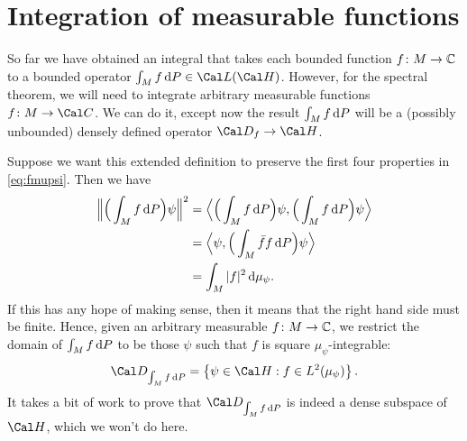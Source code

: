 \section{Integration of measurable functions}

So far we have obtained an integral that takes each bounded function
\(f\colon M\to\mathbb{C}\) to a bounded operator \(\int_Mf\d P\in\Cal L(\Cal
H)\).
However, for the spectral theorem, we will need to integrate arbitrary
measurable functions \(f\colon M\to\Cal C\). We can do it, except now
the result \(\int_Mf\mathop{}\!\mathrm{d} P\) will be a (possibly unbounded) densely
defined operator \(\Cal D_f\to\Cal H\).

Suppose we want this extended definition to preserve the first four
properties in \eqref{eq:fmupsi}. Then we have
\begin{align}
  \Big\|\Big(\int_Mf\mathop{}\!\mathrm{d} P\Big) \psi\Big\|^{2}
  &= \Big\langle\Big(\int_Mf\mathop{}\!\mathrm{d} P\Big) \psi,
    \Big(\int_Mf\mathop{}\!\mathrm{d} P\Big) \psi\Big\rangle \\
  &= \Big\langle \psi,
    \Big(\int_M\bar f f\mathop{}\!\mathrm{d} P\Big) \psi\Big\rangle \\
  &= \int_M |f|^{2}\mathop{}\!\mathrm{d}\mu_\psi
.\end{align}
If this has any hope of making sense, then it means that the right
hand side must be finite.
Hence, given an arbitrary measurable \(f\colon M\to\mathbb{C}\),
we restrict the domain of \(\int_Mf\mathop{}\!\mathrm{d} P\) to be those \(\psi\)
such that \(f\) is square \(\mu_\psi\)-integrable:
\begin{equation}
  \Cal D_{\int_Mf\d P}
  =
  \left\{
    \psi\in\Cal H
    :
    f \in L^{2}(\mu_\psi)
  \right\}
.\end{equation}
It takes a bit of work to prove that \(\Cal D_{\int_Mf\d P}\) is
indeed a dense subspace of \(\Cal H\), which we won't do here.

